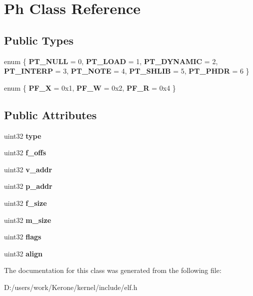 \section{Ph Class Reference}
\label{class_ph}
\subsection*{Public Types}
\begin{DoxyCompactItemize}
\item 
\mbox{\label{class_ph_afa4b07600e6f61b9415ca389f389541f}} 
enum \{ \newline
{\bfseries P\+T\+\_\+\+N\+U\+LL} = 0, 
{\bfseries P\+T\+\_\+\+L\+O\+AD} = 1, 
{\bfseries P\+T\+\_\+\+D\+Y\+N\+A\+M\+IC} = 2, 
{\bfseries P\+T\+\_\+\+I\+N\+T\+E\+RP} = 3, 
\newline
{\bfseries P\+T\+\_\+\+N\+O\+TE} = 4, 
{\bfseries P\+T\+\_\+\+S\+H\+L\+IB} = 5, 
{\bfseries P\+T\+\_\+\+P\+H\+DR} = 6
 \}
\item 
\mbox{\label{class_ph_afe6ae31886d0199fe9b8ca96bb1d79e0}} 
enum \{ {\bfseries P\+F\+\_\+X} = 0x1, 
{\bfseries P\+F\+\_\+W} = 0x2, 
{\bfseries P\+F\+\_\+R} = 0x4
 \}
\end{DoxyCompactItemize}
\subsection*{Public Attributes}
\begin{DoxyCompactItemize}
\item 
\mbox{\label{class_ph_a73f57b035e028666fa2a53a529482497}} 
uint32 {\bfseries type}
\item 
\mbox{\label{class_ph_ae2535c4c4dd43b2f308867166012d0d2}} 
uint32 {\bfseries f\+\_\+offs}
\item 
\mbox{\label{class_ph_a57fed3a8053f89df807dc26b67b8739b}} 
uint32 {\bfseries v\+\_\+addr}
\item 
\mbox{\label{class_ph_a211521a2e01e450b553b2c2de31e22e2}} 
uint32 {\bfseries p\+\_\+addr}
\item 
\mbox{\label{class_ph_a92c01cd712913b3ec4d7ba2d49e2f63d}} 
uint32 {\bfseries f\+\_\+size}
\item 
\mbox{\label{class_ph_a284f352ba77ef05c4889dd9cccb1e8f3}} 
uint32 {\bfseries m\+\_\+size}
\item 
\mbox{\label{class_ph_a89aed31fd49ab71786ec89e9c2b3f58f}} 
uint32 {\bfseries flags}
\item 
\mbox{\label{class_ph_ad9c02edb48e56d1ac31ce28a7ca4deca}} 
uint32 {\bfseries align}
\end{DoxyCompactItemize}


The documentation for this class was generated from the following file\+:\begin{DoxyCompactItemize}
\item 
D\+:/users/work/\+Kerone/kernel/include/elf.\+h\end{DoxyCompactItemize}
